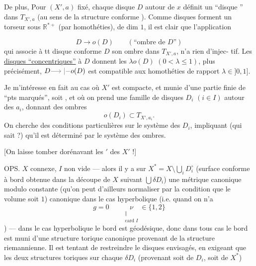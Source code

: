 De plus, Pour $(X',a)$ fixé, chaque
disque $D$ autour de $x$ définit un
``disque '' dans $T_{X',a}$ (au sens de
la structure  conforme ). Comme
 disques forment un torseur sous
$\mathbb R^{*+}$ (par homothéties), 
de dim $1$, il est clair que l'application

\[
D\longrightarrow o(D)\qquad (\text{``ombre de $D$''})
\]
qui associe à tt disque conforme 
$D$ son ombre dans $T_{X',a}$, n'a rien d'injec-
tif. Les \uline{disques ``concentriques''} à $D$
donnent les $\lambda o(D)$ $(0<\lambda\leq1)$, plus
précisément, $D\unsure{\longrightarrow|-}o(D)$ est compatible aux
homothéties de rapport  $\lambda\in]0,1]$.

Je m'intéresse en fait au cas
où $X'$ est compacte, et munie d'une
 partie finie de ``pts marqués'', soit
, et où on prend une famille
de disques $D_i$ $(i\in I)$  autour des $a_i$,
donnant des ombres
\[
o(D_i)\subset T_{X',a_i}.
\]
On cherche des conditions particulières
 sur le système des $D_i$, impliquant
(qui sait ?) qu'il est déterminé par
le système des ombres.

[On laisse tomber dorénavant les $'$ des $X'$ !]


OPS. $X$ connexe, $I$ non vide --- alors
il y a sur $X^*=X\setminus\bigcup_i D_i^\circ$ (surface
conforme à bord obtenue dans la
découpe de $X$ suivant $\bigcup\delta D_i$) une
 métrique  canonique modulo
constante (qu'on peut d'ailleurs normaliser
par la condition que le volume soit $1$)
 canonique  dans le cas
hyperbolique (i.e. quand on n'a
\[
g=0\qquad \underset{\substack{\Vert\\\text{card }I}}{\nu}\in\{1,2\}
\]
) --- dans le cas
hyperbolique le bord est géodésique,
donc dans tous cas le bord est muni
d'une structure torique canonique
provenant de la structure riemannienne.
Il est tentant de restreindre le 
disques envisagés, en exigeant que
les deux structures toriques sur
chaque $\delta D_i$ (provenant soit de $D_i$, soit de $X^*$)

